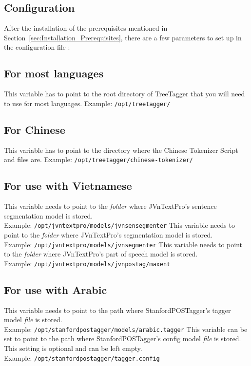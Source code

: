 \subsection{Configuration}\label{sec:Installation_Configuration}
After the installation of the prerequisites mentioned in Section~\ref{sec:Installation_Prerequisites}, there are a few parameters to set up in the configuration file \configFile{}:
\begin{itemize}

\subsection*{\textbf{For most languages}}
This variable has to point to the root directory of TreeTagger that you will need to use for most languages.
Example: \texttt{/opt/treetagger/}

\subsection*{\textbf{For Chinese}}
This variable has to point to the directory where the Chinese Tokenizer Script and files are.
Example: \texttt{/opt/treetagger/chinese-tokenizer/}

\subsection*{\textbf{For use with Vietnamese}}
This variable needs to point to the \textit{folder} where JVnTextPro's sentence segmentation model is stored. \\
Example: \texttt{/opt/jvntextpro/models/jvnsensegmenter}
This variable needs to point to the \textit{folder} where JVnTextPro's segmentation model is stored. \\
Example: \texttt{/opt/jvntextpro/models/jvnsegmenter}
This variable needs to point to the \textit{folder} where JVnTextPro's part of speech model is stored. \\
Example: \texttt{/opt/jvntextpro/models/jvnpostag/maxent}

\subsection*{\textbf{For use with Arabic}}
This variable needs to point to the path where StanfordPOSTagger's tagger model \textit{file} is stored. \\
Example: \texttt{/opt/stanfordpostagger/models/arabic.tagger}
This variable can be set to point to the path where StanfordPOSTagger's config model \textit{file} is stored. This setting is optional and can be left empty. \\
Example: \texttt{/opt/stanfordpostagger/tagger.config}


\end{itemize}
